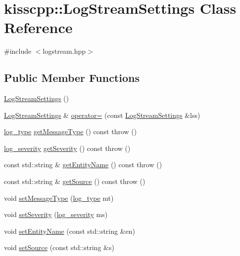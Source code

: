 \hypertarget{classkisscpp_1_1_log_stream_settings}{\section{kisscpp\-:\-:Log\-Stream\-Settings Class Reference}
\label{classkisscpp_1_1_log_stream_settings}
}


{\ttfamily \#include $<$logstream.\-hpp$>$}

\subsection*{Public Member Functions}
\begin{DoxyCompactItemize}
\item 
\hyperlink{classkisscpp_1_1_log_stream_settings_ae0d0e39dbc8875294d0b28579138bdd5}{Log\-Stream\-Settings} ()
\item 
\hyperlink{classkisscpp_1_1_log_stream_settings}{Log\-Stream\-Settings} \& \hyperlink{classkisscpp_1_1_log_stream_settings_ac0fcc9f978329329f027a251620fe3d2}{operator=} (const \hyperlink{classkisscpp_1_1_log_stream_settings}{Log\-Stream\-Settings} \&lss)
\item 
\hyperlink{namespacekisscpp_a18db16d1f4c281bec16e637c56b0cc88}{log\-\_\-type} \hyperlink{classkisscpp_1_1_log_stream_settings_a47d6a4154439d6e4618ddc8fe27df290}{get\-Message\-Type} () const   throw ()
\item 
\hyperlink{namespacekisscpp_a2479a56cdedf21357ca5c68adc699d00}{log\-\_\-severity} \hyperlink{classkisscpp_1_1_log_stream_settings_a601620fefa23f83bdd309a902689e851}{get\-Severity} () const   throw ()
\item 
const std\-::string \& \hyperlink{classkisscpp_1_1_log_stream_settings_a96e829a671c13d1895f64ea34735140f}{get\-Entity\-Name} () const   throw ()
\item 
const std\-::string \& \hyperlink{classkisscpp_1_1_log_stream_settings_a80153606d7e53c45cb3a05a99d770fb2}{get\-Source} () const   throw ()
\item 
void \hyperlink{classkisscpp_1_1_log_stream_settings_a45dbf8235751be1255e9b8aa0e64c282}{set\-Message\-Type} (\hyperlink{namespacekisscpp_a18db16d1f4c281bec16e637c56b0cc88}{log\-\_\-type} mt)
\item 
void \hyperlink{classkisscpp_1_1_log_stream_settings_a8512012926ee2b32b5768ba87eaba788}{set\-Severity} (\hyperlink{namespacekisscpp_a2479a56cdedf21357ca5c68adc699d00}{log\-\_\-severity} ms)
\item 
void \hyperlink{classkisscpp_1_1_log_stream_settings_a147829d31ae248a3b510d7f721fc4891}{set\-Entity\-Name} (const std\-::string \&en)
\item 
void \hyperlink{classkisscpp_1_1_log_stream_settings_ac370b7ef8b02c76c2f0ddb7f9d2e1930}{set\-Source} (const std\-::string \&s)
\end{DoxyCompactItemize}


